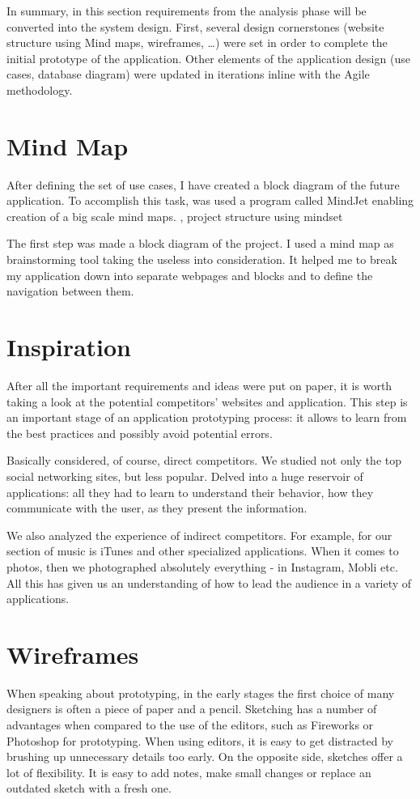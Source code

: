 In summary, in this section requirements from the analysis phase will be converted into the system design. First, several design cornerstones (website structure using Mind maps, wireframes, …) were set in order to complete the initial prototype of the application. Other elements of the application design (use cases, database diagram) were updated in iterations inline with the Agile methodology. 

\section{Mind Map}
\label{sec:mindmap_prototype}
After defining the set of use cases, I have created a block diagram of the future application. To accomplish this task, was used a program called MindJet enabling creation of a big scale mind maps. , project structure using mindset 

The first step was made a block diagram of the project. I used a mind map as brainstorming tool taking the useless into consideration. It helped me to break my application down into separate webpages and blocks and to define the navigation between them. 

\section{Inspiration}
\label{sec:inspiration_prototype}
After all the important requirements and ideas were put on paper, it is worth taking a look at the potential competitors’ websites and application. This step is an important stage of an application prototyping process: it allows to learn from the best practices and possibly avoid potential errors.

Basically considered, of course, direct competitors. We studied not only the top social networking sites, but less popular. Delved into a huge reservoir of applications: all they had to learn to understand their behavior, how they communicate with the user, as they present the information.

We also analyzed the experience of indirect competitors. For example, for our section of music is iTunes and other specialized applications. When it comes to photos, then we photographed absolutely everything - in Instagram, Mobli etc. All this has given us an understanding of how to lead the audience in a variety of applications.

\section{Wireframes}
\label{sec:wireframes_prototype}
When speaking about prototyping, in the early stages the first choice of many designers is often a piece of paper and a pencil. Sketching has a number of advantages when compared to the use of the editors, such as Fireworks or Photoshop for prototyping. When using editors, it is easy to get distracted by brushing up unnecessary details too early. On the opposite side, sketches offer a lot of flexibility. It is easy to add notes, make small changes or replace an outdated sketch with a fresh one.

